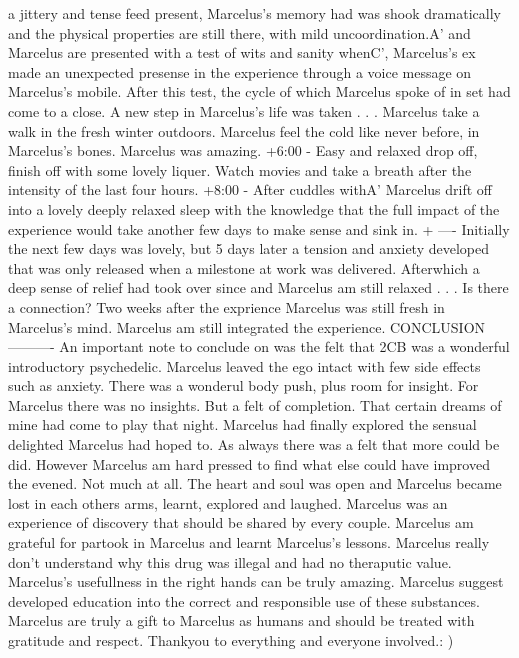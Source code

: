 \documentclass[12pt]{book}
\begin{document}
a jittery and tense feed present, Marcelus's memory had was shook dramatically and the physical properties are still there, with mild uncoordination.A' and Marcelus are presented with a test of wits and sanity whenC', Marcelus's ex made an unexpected presense in the experience through a voice message on Marcelus's mobile. After this test, the cycle of which Marcelus spoke of in set had come to a close. A new step in Marcelus's life was taken . . .  Marcelus take a walk in the fresh winter outdoors. Marcelus feel the cold like never before, in Marcelus's bones. Marcelus was amazing. +6:00 - Easy and relaxed drop off, finish off with some lovely liquer. Watch movies and take a breath after the intensity of the last four hours. +8:00 - After cuddles withA' Marcelus drift off into a lovely deeply relaxed sleep with the knowledge that the full impact of the experience would take another few days to make sense and sink in. + ---- Initially the next few days was lovely, but 5 days later a tension and anxiety developed that was only released when a milestone at work was delivered. Afterwhich a deep sense of relief had took over since and Marcelus am still relaxed . . .  Is there a connection? Two weeks after the exprience Marcelus was still fresh in Marcelus's mind. Marcelus am still integrated the experience. CONCLUSION ---------- An important note to conclude on was the felt that 2CB was a wonderful introductory psychedelic. Marcelus leaved the ego intact with few side effects such as anxiety. There was a wonderul body push, plus room for insight. For Marcelus there was no insights. But a felt of completion. That certain dreams of mine had come to play that night. Marcelus had finally explored the sensual delighted Marcelus had hoped to. As always there was a felt that more could be did. However Marcelus am hard pressed to find what else could have improved the evened. Not much at all. The heart and soul was open and Marcelus became lost in each others arms, learnt, explored and laughed. Marcelus was an experience of discovery that should be shared by every couple. Marcelus am grateful for partook in Marcelus and learnt Marcelus's lessons. Marcelus really don't understand why this drug was illegal and had no theraputic value. Marcelus's usefullness in the right hands can be truly amazing. Marcelus suggest developed education into the correct and responsible use of these substances. Marcelus are truly a gift to Marcelus as humans and should be treated with gratitude and respect. Thankyou to everything and everyone involved.: )
\end{document}
